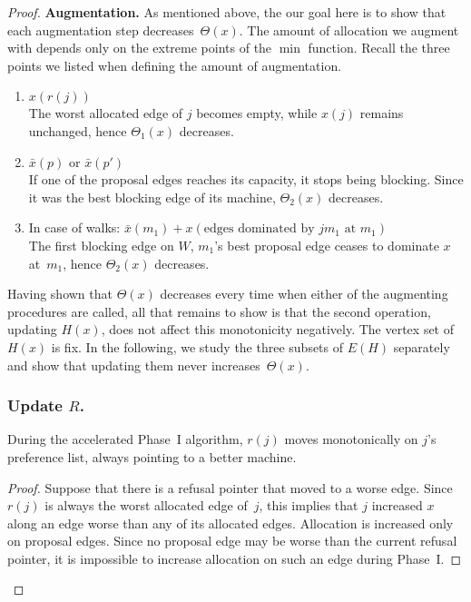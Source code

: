\documentclass{llncs}
\begin{document}
\begin{proof}
\textbf{Augmentation.} As mentioned above, the our goal here is to show that each augmentation step decreases~$\Theta(x)$. The amount of allocation we augment with depends only on the extreme points of the $\min$ function. Recall the three points we listed when defining the amount of augmentation.
\begin{enumerate}
	\item $x(r(j))$ \\ The worst allocated edge of $j$ becomes empty, while $x(j)$ remains unchanged, hence $\Theta_1(x)$ decreases.
	\item $\bar{x}(p)$ or $\bar{x}(p')$ \\ If one of the proposal edges reaches its capacity, it stops being blocking. Since it was the best blocking edge of its machine, $\Theta_2(x)$ decreases.
	\item In case of walks: $\bar{x}(m_1) + x(\text{edges dominated by } jm_1 \text{ at } m_1)$ \\ The first blocking edge on $W$, $m_1$'s best proposal edge ceases to dominate $x$ at~$m_1$, hence $\Theta_2(x)$ decreases.
\end{enumerate}

Having shown that $\Theta(x)$ decreases every time when either of the augmenting procedures are called, all that remains to show is that the second operation, updating $H(x)$, does not affect this monotonicity negatively. The vertex set of $H(x)$ is fix. In the following, we study the three subsets of $E(H)$ separately and show that updating them never increases~$\Theta(x)$. 

\subsubsection*{Update $R$.}

\begin{lemma}
\label{r_mon}
	During the accelerated Phase~I algorithm, $r(j)$ moves monotonically on $j$'s preference list, always pointing to a better machine.
\end{lemma}

\begin{proof}
	Suppose that there is a refusal pointer that moved to a worse edge. Since $r(j)$ is always the worst allocated edge of~$j$, this implies that $j$ increased $x$ along an edge worse than any of its allocated edges. Allocation is increased only on proposal edges. Since no proposal edge may be worse than the current refusal pointer, it is impossible to increase allocation on such an edge during Phase~I.
\end{proof}


\end{proof}
\end{document}
